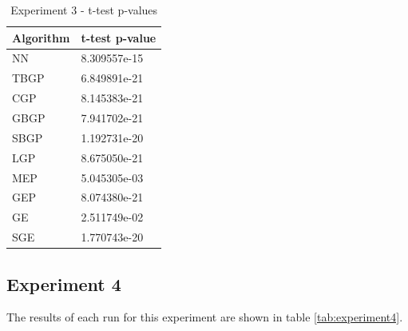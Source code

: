 \begin{table}[!htbp]
    \begin{center}
        \begin{tabular}{|l|l|} 
         \hline
            Algorithm & t-test p-value \\ [0.5ex] \hline\hline
            NN & 8.309557e-15 \\
            \hline
            TBGP & 6.849891e-21 \\
            \hline
            CGP & 8.145383e-21 \\
            \hline
            GBGP & 7.941702e-21 \\
            \hline
            SBGP & 1.192731e-20 \\
            \hline
            LGP & 8.675050e-21 \\
            \hline
            MEP & 5.045305e-03 \\
            \hline
            GEP & 8.074380e-21 \\
            \hline
            GE & 2.511749e-02 \\
            \hline
            SGE & 1.770743e-20 \\
            \hline
        \end{tabular}
    \end{center}
    \caption{Experiment 3 - t-test p-values}
\label{tab:experiment3_stat}
\end{table}

\subsection{Experiment 4}

The results of each run for this experiment are shown in table \ref{tab:experiment4}.

